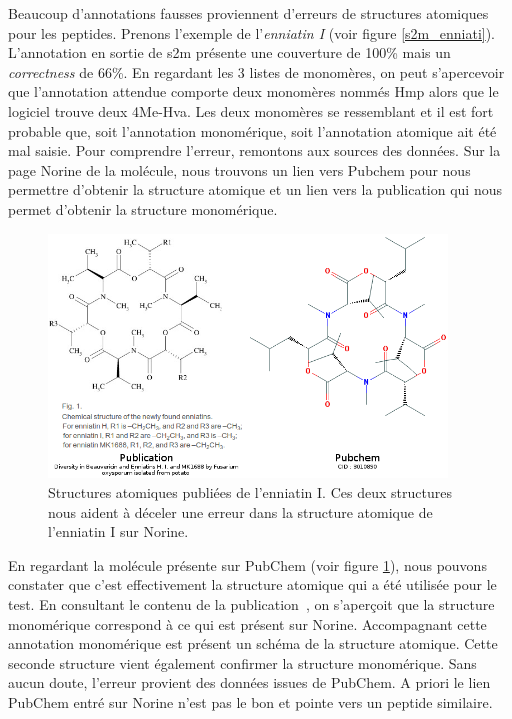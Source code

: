 Beaucoup d'annotations fausses proviennent d'erreurs de structures atomiques pour les peptides.
Prenons l'exemple de l'\textit{enniatin I} (voir figure \ref{s2m_enniati}).
L'annotation en sortie de s2m présente une couverture de 100\% mais un \textit{correctness} de 66\%.
En regardant les 3 listes de monomères, on peut s'apercevoir que l'annotation attendue comporte deux monomères nommés Hmp alors que le logiciel trouve deux 4Me-Hva.
Les deux monomères se ressemblant et il est fort probable que, soit l'annotation monomérique, soit l'annotation atomique ait été mal saisie.
Pour comprendre l'erreur, remontons aux sources des données.
Sur la page Norine de la molécule, nous trouvons un lien vers Pubchem pour nous permettre d'obtenir la structure atomique et un lien vers la publication qui nous permet d'obtenir la structure monomérique.

\begin{figure}[h!]
  \begin{center}
    \includegraphics[width=400px]{Figures/s2m/results/enniatinI_corrections.png}
    \caption{\label{enni_cor}Structures atomiques publiées de l'enniatin I.
    Ces deux structures nous aident à déceler une erreur dans la structure atomique de l'enniatin I sur Norine.}
  \end{center}
\end{figure}

En regardant la molécule présente sur PubChem (voir figure \ref{enni_cor}), nous pouvons constater que c'est effectivement la structure atomique qui a été utilisée pour le test.
En consultant le contenu de la publication~\cite{song_diversity_2008}, on s'aperçoit que la structure monomérique correspond à ce qui est présent sur Norine.
Accompagnant cette annotation monomérique est présent un schéma de la structure atomique.
Cette seconde structure vient également confirmer la structure monomérique.
Sans aucun doute, l'erreur provient des données issues de PubChem.
A priori le lien PubChem entré sur Norine n'est pas le bon et pointe vers un peptide similaire.

